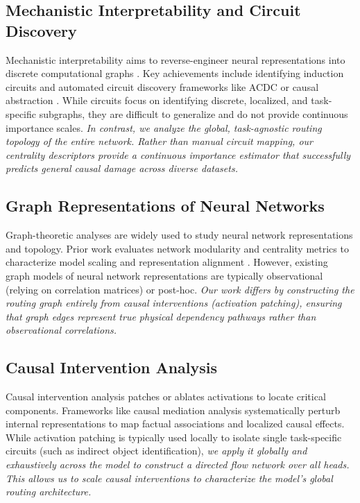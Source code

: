 \documentclass[11pt,a4paper]{article}
\theoremstyle{definition}
\theoremstyle{plain}
\begin{document}
\subsection{Mechanistic Interpretability and Circuit Discovery}
Mechanistic interpretability aims to reverse-engineer neural representations into discrete computational graphs \citep{elhage2021mathematical}. Key achievements include identifying induction circuits \citep{olsson2022induction} and automated circuit discovery frameworks like ACDC \citep{conmy2023acdc} or causal abstraction \citep{geiger2024causal}. While circuits focus on identifying discrete, localized, and task-specific subgraphs, they are difficult to generalize and do not provide continuous importance scales. \emph{In contrast, we analyze the global, task-agnostic routing topology of the entire network. Rather than manual circuit mapping, our centrality descriptors provide a continuous importance estimator that successfully predicts general causal damage across diverse datasets.}

\subsection{Graph Representations of Neural Networks}
Graph-theoretic analyses are widely used to study neural network representations and topology. Prior work evaluates network modularity and centrality metrics to characterize model scaling and representation alignment \citep{clark2019bertlook, goldblum2024battle}. However, existing graph models of neural network representations are typically observational (relying on correlation matrices) or post-hoc. \emph{Our work differs by constructing the routing graph entirely from causal interventions (activation patching), ensuring that graph edges represent true physical dependency pathways rather than observational correlations.}

\subsection{Causal Intervention Analysis}
Causal intervention analysis patches or ablates activations to locate critical components. Frameworks like causal mediation analysis \citep{meng2022rome} systematically perturb internal representations to map factual associations and localized causal effects. While activation patching is typically used locally to isolate single task-specific circuits (such as indirect object identification), \emph{we apply it globally and exhaustively across the model to construct a directed flow network over all heads. This allows us to scale causal interventions to characterize the model's global routing architecture.}
\end{document}
